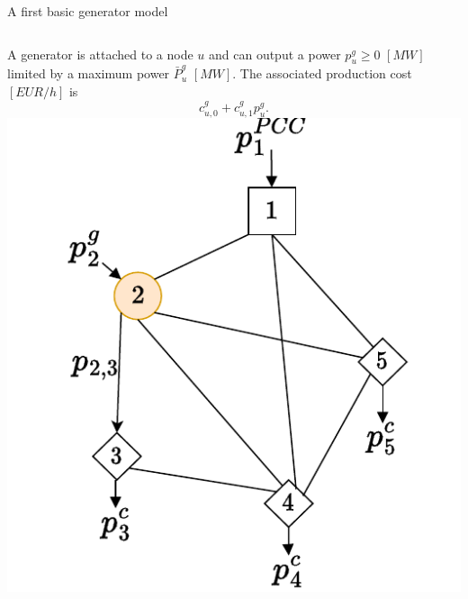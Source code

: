\begin{frame}{A first basic generator model}
\begin{columns}
    A generator is attached to a node $u$ and can output a power $p^g_u \geq 0$ $[MW]$ limited by a maximum power $\bar{P}^g_u$ $[MW]$. The associated production cost $[EUR/h]$ is $$c^g_{u,0} + c^g_{u,1}p^g_u.$$
\includegraphics[width=\textwidth]{images/netwok_flow-Page-3_drawio.pdf}
\end{columns}
\end{frame}

